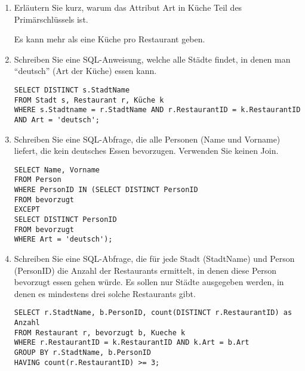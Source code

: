 \documentclass{bschlangaul-aufgabe}
\begin{document}
\begin{enumerate}


\item Erläutern Sie kurz, warum das Attribut Art in Küche Teil des
Primärschlüssels ist.

\begin{liAntwort}
Es kann mehr als eine Küche pro Restaurant geben.
\end{liAntwort}


\item Schreiben Sie eine SQL-Anweisung, welche alle Städte findet, in
denen man “deutsch” (Art der Küche) essen kann.

\begin{liAntwort}
\begin{verbatim}
SELECT DISTINCT s.StadtName
FROM Stadt s, Restaurant r, Küche k
WHERE s.Stadtname = r.StadtName AND r.RestaurantID = k.RestaurantID AND Art = 'deutsch';
\end{verbatim}
\end{liAntwort}


\item Schreiben Sie eine SQL-Abfrage, die alle Personen (Name und
Vorname) liefert, die kein deutsches Essen bevorzugen. Verwenden Sie
keinen Join.

\begin{liAntwort}
\begin{verbatim}
SELECT Name, Vorname
FROM Person
WHERE PersonID IN (SELECT DISTINCT PersonID
FROM bevorzugt
EXCEPT
SELECT DISTINCT PersonID
FROM bevorzugt
WHERE Art = 'deutsch');
\end{verbatim}
\end{liAntwort}


\item Schreiben Sie eine SQL-Abfrage, die für jede Stadt (StadtName) und
Person (PersonID) die Anzahl der Restaurants ermittelt, in denen diese
Person bevorzugt essen gehen würde. Es sollen nur Städte ausgegeben
werden, in denen es mindestens drei solche Restaurants gibt.

\begin{liAntwort}
\begin{verbatim}
SELECT r.StadtName, b.PersonID, count(DISTINCT r.RestaurantID) as Anzahl
FROM Restaurant r, bevorzugt b, Kueche k
WHERE r.RestaurantID = k.RestaurantID AND k.Art = b.Art
GROUP BY r.StadtName, b.PersonID
HAVING count(r.RestaurantID) >= 3;
\end{verbatim}
\end{liAntwort}


\end{enumerate}
\end{document}
